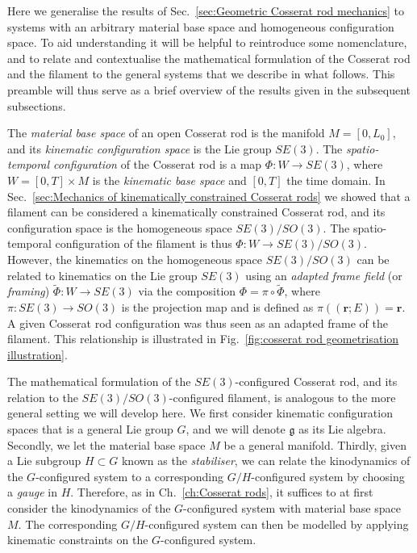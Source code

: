 Here we generalise the results of Sec.~\ref{sec:Geometric Cosserat rod mechanics} to systems with an arbitrary material base space and homogeneous configuration space. To aid understanding it will be helpful to reintroduce some nomenclature, and to relate and contextualise the mathematical formulation of the Cosserat rod and the filament to the general systems that we describe in what follows. This preamble will thus serve as a brief overview of the results given in the subsequent subsections.

The \textit{material base space} of an open Cosserat rod is the manifold $M = [0, L_0]$, and its \textit{kinematic configuration space} is the Lie group $SE(3)$. The \textit{spatio-temporal configuration} of the Cosserat rod is a map $\Phi : W \to SE(3)$, where $W = [0,T] \times M$ is the \textit{kinematic base space} and $[0,T]$ the time domain. In Sec.~\ref{sec:Mechanics of kinematically constrained Cosserat rods} we showed that a filament can be considered a kinematically constrained Cosserat rod, and its configuration space is the homogeneous space $SE(3)/SO(3)$. The spatio-temporal configuration of the filament is thus $\Phi : W \to SE(3) / SO(3)$. However, the kinematics on the homogeneous space $SE(3) / SO(3)$ can be related to kinematics on the Lie group $SE(3)$ using an \textit{adapted frame field} (or \textit{framing}) $\tilde{\Phi} : W \to SE(3)$ via the composition $\Phi = \pi \circ \tilde{\Phi}$, where $\pi : SE(3) \to SO(3)$ is the projection map and is defined as $\pi((\mathbf{r} ; E)) = \mathbf{r}$. A given Cosserat rod configuration was thus seen as an adapted frame of the filament. This relationship is illustrated in Fig.~\ref{fig:cosserat rod geometrisation illustration}.

The mathematical formulation of the $SE(3)$-configured Cosserat rod, and its relation to the $SE(3)/SO(3)$-configured filament, is analogous to the more general setting we will develop here. We first consider kinematic configuration spaces that is a general Lie group $G$, and we will denote $\mathfrak{g}$ as its Lie algebra. Secondly, we let the material base space $M$ be a general manifold. Thirdly, given a Lie subgroup $H \subset G$ known as the \textit{stabiliser}, we can relate the kinodynamics of the $G$-configured system to a corresponding $G/H$-configured system by choosing a \textit{gauge} in $H$. Therefore, as in Ch.~\ref{ch:Cosserat rods}, it suffices to at first consider the kinodynamics of the $G$-configured system with material base space $M$. The corresponding $G/H$-configured system can then be modelled by applying kinematic constraints on the $G$-configured system.

